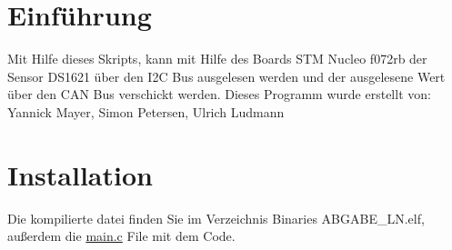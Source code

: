 \hypertarget{index_intro_sec}{}\section{Einführung}\label{index_intro_sec}
Mit Hilfe dieses Skripts, kann mit Hilfe des Boards S\+TM Nucleo f072rb der Sensor D\+S1621 über den I2C Bus ausgelesen werden und der ausgelesene Wert über den C\+AN Bus verschickt werden. Dieses Programm wurde erstellt von\+: Yannick Mayer, Simon Petersen, Ulrich Ludmann \hypertarget{index_install_sec}{}\section{Installation}\label{index_install_sec}
Die kompilierte datei finden Sie im Verzeichnis Binaries A\+B\+G\+A\+B\+E\+\_\+\+L\+N.\+elf, außerdem die \hyperlink{main_8c}{main.\+c} File mit dem Code. 